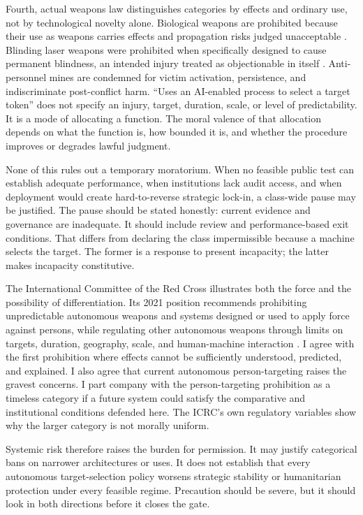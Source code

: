 \documentclass[11pt]{article}
\begin{document}
Fourth, actual weapons law distinguishes categories by effects and ordinary use, not by technological novelty alone. Biological weapons are prohibited because their use as weapons carries effects and propagation risks judged unacceptable \citep{bwc1972}. Blinding laser weapons were prohibited when specifically designed to cause permanent blindness, an intended injury treated as objectionable in itself \citep{ccw1995}. Anti-personnel mines are condemned for victim activation, persistence, and indiscriminate post-conflict harm. ``Uses an AI-enabled process to select a target token'' does not specify an injury, target, duration, scale, or level of predictability. It is a mode of allocating a function. The moral valence of that allocation depends on what the function is, how bounded it is, and whether the procedure improves or degrades lawful judgment.

None of this rules out a temporary moratorium. When no feasible public test can establish adequate performance, when institutions lack audit access, and when deployment would create hard-to-reverse strategic lock-in, a class-wide pause may be justified. The pause should be stated honestly: current evidence and governance are inadequate. It should include review and performance-based exit conditions. That differs from declaring the class impermissible because a machine selects the target. The former is a response to present incapacity; the latter makes incapacity constitutive.

The International Committee of the Red Cross illustrates both the force and the possibility of differentiation. Its 2021 position recommends prohibiting unpredictable autonomous weapons and systems designed or used to apply force against persons, while regulating other autonomous weapons through limits on targets, duration, geography, scale, and human-machine interaction \citep{icrc2021}. I agree with the first prohibition where effects cannot be sufficiently understood, predicted, and explained. I also agree that current autonomous person-targeting raises the gravest concerns. I part company with the person-targeting prohibition as a timeless category if a future system could satisfy the comparative and institutional conditions defended here. The ICRC's own regulatory variables show why the larger category is not morally uniform.

Systemic risk therefore raises the burden for permission. It may justify categorical bans on narrower architectures or uses. It does not establish that every autonomous target-selection policy worsens strategic stability or humanitarian protection under every feasible regime. Precaution should be severe, but it should look in both directions before it closes the gate.
\end{document}
